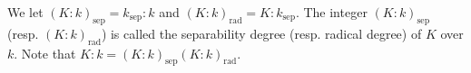 We let $(K:k)_{\text{sep}} = k_{\text{sep}}:k$ and $(K:k)_{\text{rad}} = K:k_{\text{sep}}$. The integer $(K:k)_{\text{sep}}$ (resp. $(K:k)_{\text{rad}}$) is called the separability degree (resp. radical degree) of $K$ over $k$. Note that $K:k = (K:k)_{\text{sep}}(K:k)_{\text{rad}}$.
